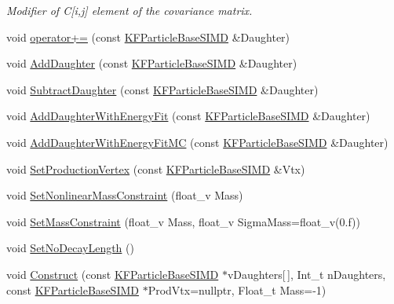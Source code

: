 \begin{DoxyCompactItemize}
\begin{DoxyCompactList}\small\item\em Modifier of C\mbox{[}i,j\mbox{]} element of the covariance matrix. \end{DoxyCompactList}\item 
void \hyperlink{classKFParticleBaseSIMD_a2cc73a1a3812b9e58ab777131d74b058}{operator+=} (const \hyperlink{classKFParticleBaseSIMD}{K\+F\+Particle\+Base\+S\+I\+MD} \&Daughter)
\item 
void \hyperlink{classKFParticleBaseSIMD_a2ee0cc29dedac6767db45ae197a0fe35}{Add\+Daughter} (const \hyperlink{classKFParticleBaseSIMD}{K\+F\+Particle\+Base\+S\+I\+MD} \&Daughter)
\item 
void \hyperlink{classKFParticleBaseSIMD_afce83e9f433c1ccc698197ae2ffe36d4}{Subtract\+Daughter} (const \hyperlink{classKFParticleBaseSIMD}{K\+F\+Particle\+Base\+S\+I\+MD} \&Daughter)
\item 
void \hyperlink{classKFParticleBaseSIMD_a31bbbd45b75df2d238522b1607ee5726}{Add\+Daughter\+With\+Energy\+Fit} (const \hyperlink{classKFParticleBaseSIMD}{K\+F\+Particle\+Base\+S\+I\+MD} \&Daughter)
\item 
void \hyperlink{classKFParticleBaseSIMD_affe2b18e82526005b6f34cd213a1f579}{Add\+Daughter\+With\+Energy\+Fit\+MC} (const \hyperlink{classKFParticleBaseSIMD}{K\+F\+Particle\+Base\+S\+I\+MD} \&Daughter)
\item 
void \hyperlink{classKFParticleBaseSIMD_ab9370932a09a02d6498ca4c960caba13}{Set\+Production\+Vertex} (const \hyperlink{classKFParticleBaseSIMD}{K\+F\+Particle\+Base\+S\+I\+MD} \&Vtx)
\item 
void \hyperlink{classKFParticleBaseSIMD_a5583455557dbd2de22cc0adbee47b3be}{Set\+Nonlinear\+Mass\+Constraint} (float\+\_\+v Mass)
\item 
void \hyperlink{classKFParticleBaseSIMD_af05cfb05f0e552e283dd0cdc33c92327}{Set\+Mass\+Constraint} (float\+\_\+v Mass, float\+\_\+v Sigma\+Mass=float\+\_\+v(0.f))
\item 
void \hyperlink{classKFParticleBaseSIMD_a21beb9923513d2ec67d0d00a1b232d96}{Set\+No\+Decay\+Length} ()
\item 
void \hyperlink{classKFParticleBaseSIMD_a768c539d5e5a59f6425d9eed0c1b1545}{Construct} (const \hyperlink{classKFParticleBaseSIMD}{K\+F\+Particle\+Base\+S\+I\+MD} $\ast$v\+Daughters\mbox{[}$\,$\mbox{]}, Int\+\_\+t n\+Daughters, const \hyperlink{classKFParticleBaseSIMD}{K\+F\+Particle\+Base\+S\+I\+MD} $\ast$Prod\+Vtx=nullptr, Float\+\_\+t Mass=-\/1)
\item 

\end{DoxyCompactItemize}
